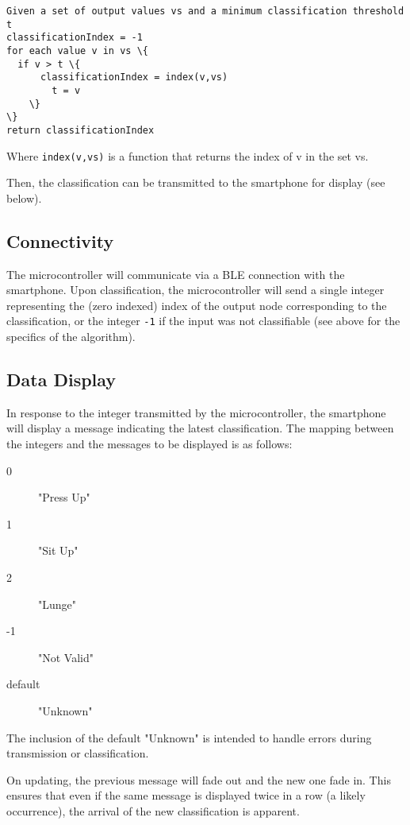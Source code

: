 \documentclass[a4paper]{article}
\begin{document}
\begin{lstlisting}
Given a set of output values vs and a minimum classification threshold t
classificationIndex = -1
for each value v in vs \{
  if v > t \{
      classificationIndex = index(v,vs)
        t = v
    \}
\}
return classificationIndex
\end{lstlisting}

Where \lstinline{index(v,vs)} is a function that returns the index of v in the set vs.

Then, the classification can be transmitted to the smartphone for display (see below).

\subsection{Connectivity}%
\label{subsec:dc_connectivity}

The microcontroller will communicate via a BLE connection with the smartphone. Upon classification, the microcontroller will send a single integer representing the (zero indexed) index of the output node corresponding to the classification, or the integer \lstinline{-1} if the input was not classifiable (see above for the specifics of the algorithm).

\subsection{Data Display}%
\label{subsec:dc_datadisplay}

In response to the integer transmitted by the microcontroller, the smartphone will display a message indicating the latest classification. The mapping between the integers and the messages to be displayed is as follows:
\begin{description}
\item[0] "Press Up"
\item[1] "Sit Up"
\item[2] "Lunge"
\item[-1] "Not Valid"
\item[default] "Unknown"
\end{description}

The inclusion of the default "Unknown" is intended to handle errors during transmission or classification.

On updating, the previous message will fade out and the new one fade in. This ensures that even if the same message is displayed twice in a row (a likely occurrence), the arrival of the new classification is apparent.
\end{document}

